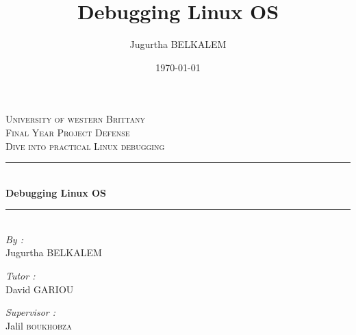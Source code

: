 \documentclass[12pt,oneside]{article}
\author{Jugurtha BELKALEM}
\title{Debugging Linux OS \\ \vspace{20px} }
\date{\today}
\begin{document}
\begin{titlepage}

\newcommand{\HRule}{\rule{\linewidth}{0.5mm}} %

\center %
 

\textsc{\LARGE University of western Brittany}\\[1.5cm] %
\textsc{\Large Final Year Project Defense}\\[0.5cm] %
\textsc{\large Dive into practical Linux debugging}\\[0.5cm] %


\HRule \\[0.4cm]
{ \huge \bfseries Debugging Linux OS}\\[0.4cm] %
\HRule \\[1.5cm]
 
\Large \emph{By :}\\
Jugurtha \textsc{BELKALEM}\\[3cm] %

\begin{minipage}{0.4\textwidth}
\begin{flushleft} \large
\emph{Tutor :}\\
David \textsc{GARIOU} %
\end{flushleft}
\end{minipage}
\begin{minipage}{0.4\textwidth}
\begin{flushright} \large
\emph{Supervisor :} \\
Jalil \textsc{boukhobza} %
\end{flushright}
\end{minipage}\\[2cm]


\end{titlepage}
\end{document}
